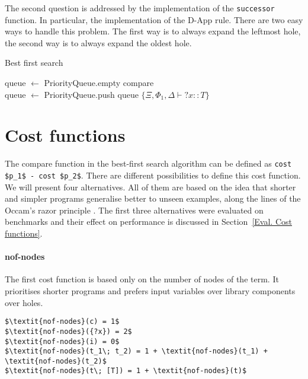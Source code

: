 The second question is addressed by the implementation of the \lstinline?successor? function. In particular, the implementation of the D-App rule. There are two easy ways to handle this problem. The first way is to always expand the leftmost hole, the second way is to always expand the oldest hole.

\begin{algorithm}
\caption{Best first search\label{alg:best-first search}}

queue $\gets$ PriorityQueue.empty {\color{blue}compare}\\
queue $\gets$ PriorityQueue.push queue $\{\Xi, \Phi_1, \Delta \vdash {?x} :: T\}$\\

\end{algorithm}

\section{Cost functions}\label{Cost functions}
The compare function in the best-first search algorithm can be defined as \lstinline?cost $p_1$ - cost $p_2$?. There are different possibilities to define this cost function. We will present four alternatives. All of them are based on the idea that shorter and simpler programs generalise better to unseen examples, along the lines of the Occam's razor principle \cite{computationalLearningTheory}. The first three alternatives were evaluated on benchmarks and their effect on performance is discussed in Section~\ref{Eval. Cost functions}.

  \paragraph{nof-nodes}
The first cost function is based only on the number of nodes of the term. It prioritises shorter programs and prefers input variables over library components over holes.
%
\begin{lstlisting}[style=algorithm]
$\textit{nof-nodes}(c) = 1$
$\textit{nof-nodes}({?x}) = 2$
$\textit{nof-nodes}(i) = 0$
$\textit{nof-nodes}(t_1\; t_2) = 1 + \textit{nof-nodes}(t_1) + \textit{nof-nodes}(t_2)$
$\textit{nof-nodes}(t\; [T]) = 1 + \textit{nof-nodes}(t)$
\end{lstlisting}
%
